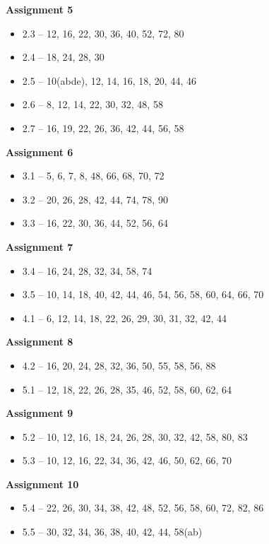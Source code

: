 \documentclass[12pt]{letter}
\newcommand{\?}{\stackrel{?}{=}}
\begin{document}
	\textbf{Assignment 5} \begin{itemize} \vspace{-12pt}
		\item 2.3 -- 12, 16, 22, 30, 36, 40, 52, 72, 80
		\item 2.4 -- 18, 24, 28, 30
		\item 2.5 -- 10(abde), 12, 14, 16, 18, 20, 44, 46
		\item 2.6 -- 8, 12, 14, 22, 30, 32, 48, 58
		\item 2.7 -- 16, 19, 22, 26, 36, 42, 44, 56, 58
	\end{itemize}

	\textbf{Assignment 6} \begin{itemize} \vspace{-12pt}
		\item 3.1 -- 5, 6, 7, 8, 48, 66, 68, 70, 72
		\item 3.2 -- 20, 26, 28, 42, 44, 74, 78, 90
		\item 3.3 -- 16, 22, 30, 36, 44, 52, 56, 64
	\end{itemize}

	\newpage
	
	\textbf{Assignment 7} \begin{itemize} \vspace{-12pt}
		\item 3.4 -- 16, 24, 28, 32, 34, 58, 74
		\item 3.5 -- 10, 14, 18, 40, 42, 44, 46, 54, 56, 58, 60, 64, 66, 70
		\item 4.1 -- 6, 12, 14, 18, 22, 26, 29, 30, 31, 32, 42, 44
	\end{itemize}

	\textbf{Assignment 8} \begin{itemize} \vspace{-12pt}
		\item 4.2 -- 16, 20, 24, 28, 32, 36, 50, 55, 58, 56, 88
		\item 5.1 -- 12, 18, 22, 26, 28, 35, 46, 52, 58, 60, 62, 64
	\end{itemize}

	\textbf{Assignment 9} \begin{itemize} \vspace{-12pt}
		\item 5.2 -- 10, 12, 16, 18, 24, 26, 28, 30, 32, 42, 58, 80, 83
		\item 5.3 -- 10, 12, 16, 22, 34, 36, 42, 46, 50, 62, 66, 70
	\end{itemize}

	\textbf{Assignment 10} \begin{itemize} \vspace{-12pt}
		\item 5.4 -- 22, 26, 30, 34, 38, 42, 48, 52, 56, 58, 60, 72, 82, 86
		\item 5.5 -- 30, 32, 34, 36, 38, 40, 42, 44, 58(ab)
	\end{itemize}
\end{document}
